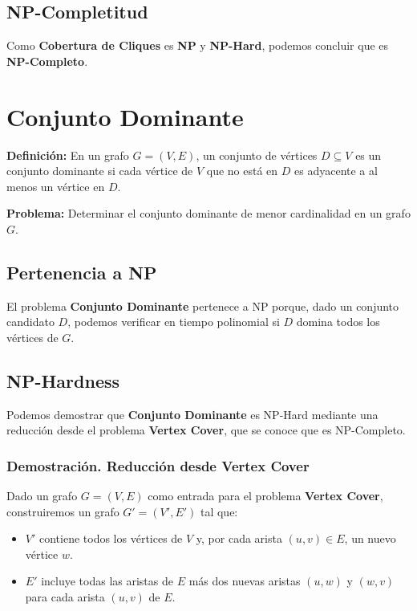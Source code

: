 \documentclass[a4paper,12pt]{article}
\begin{document}
\subsection{NP-Completitud}

Como \textbf{Cobertura de Cliques} es \textbf{NP} y \textbf{NP-Hard}, podemos concluir que es \textbf{NP-Completo}.



\section{Conjunto Dominante}

\label{sec:domatic}
\textbf{Definici\'on:} En un grafo $G = (V, E)$, un conjunto de v\'ertices $D \subseteq V$ es un conjunto dominante si cada v\'ertice de $V$ que no est\'a en $D$ es adyacente a al menos un v\'ertice en $D$. 

\textbf{Problema:} Determinar el conjunto dominante de menor cardinalidad en un grafo $G$. 

\subsection{Pertenencia a NP}

El problema \textbf{Conjunto Dominante} pertenece a NP porque, dado un conjunto candidato $D$, podemos verificar en tiempo polinomial si $D$ domina todos los v\'ertices de $G$. 

\subsection{NP-Hardness}
Podemos demostrar que \textbf{Conjunto Dominante} es NP-Hard mediante una reducci\'on desde el problema \textbf{Vertex Cover}, que se conoce que es NP-Completo.

\subsubsection{Demostraci\'on. Reducci\'on desde Vertex Cover}
Dado un grafo $G = (V, E)$ como entrada para el problema \textbf{Vertex Cover}, construiremos un grafo $G' = (V', E')$ tal que:
\begin{itemize}
    \item $V'$ contiene todos los v\'ertices de $V$ y, por cada arista $(u, v) \in E$, un nuevo v\'ertice $w$.
    \item $E'$ incluye todas las aristas de $E$ m\'as dos nuevas aristas $(u, w)$ y $(w, v)$ para cada arista $(u, v)$ de $E$.
\end{itemize}
\end{document}
